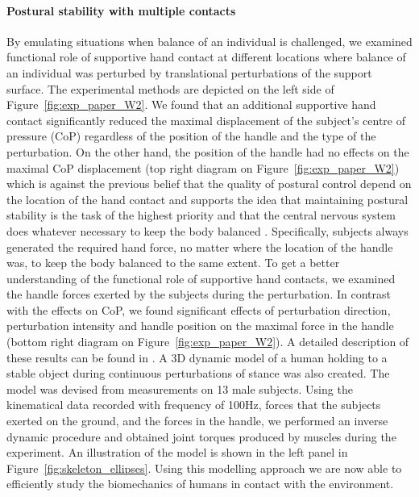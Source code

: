 \documentclass[final,5p,twocolumn]{elsarticle}
\begin{document}
\paragraph{Postural stability with multiple contacts} By emulating situations when balance of an individual is challenged, we examined functional role of supportive hand contact at different locations where balance of an individual was perturbed by translational perturbations of the support surface. The experimental methods are depicted on the left side of Figure~\ref{fig:exp_paper_W2}. We found that an additional supportive hand contact significantly reduced the maximal displacement of the subject's centre of pressure (CoP) regardless of the position of the handle and the type of the perturbation. On the other hand, the position of the handle had no effects on the maximal CoP displacement (top right diagram on Figure~\ref{fig:exp_paper_W2}) which is against the previous belief that the quality of postural control depend on the location of the hand contact \cite{Sarraf2014} and supports the idea that maintaining postural stability is the task of the highest priority and that the central nervous system does whatever necessary to keep the body balanced \cite{Winter1995}. Specifically, subjects always generated the required hand force, no matter where the location of the handle was, to keep the body balanced to the same extent. To get a better understanding of the functional role of supportive hand contacts, we examined the handle forces exerted by the subjects during the perturbation. In contrast with the effects on CoP, we found significant effects of perturbation direction, perturbation intensity and handle position on the maximal force in the handle (bottom right diagram on Figure~\ref{fig:exp_paper_W2}). A detailed description of these results can be found in  \cite{babivc2014effects}. A 3D dynamic model of a human holding to a stable object during continuous perturbations of stance was also created. The model was devised from measurements on 13 male subjects. Using the kinematical data recorded with frequency of 100Hz, forces that the subjects exerted on the ground, and the forces in the handle, we performed an inverse dynamic procedure and obtained joint torques produced by muscles during the experiment. An illustration of the model is shown in the left panel in Figure~\ref{fig:skeleton_ellipses}. Using this modelling approach we are now able to efficiently study the biomechanics of humans in contact with the environment.
\end{document}
